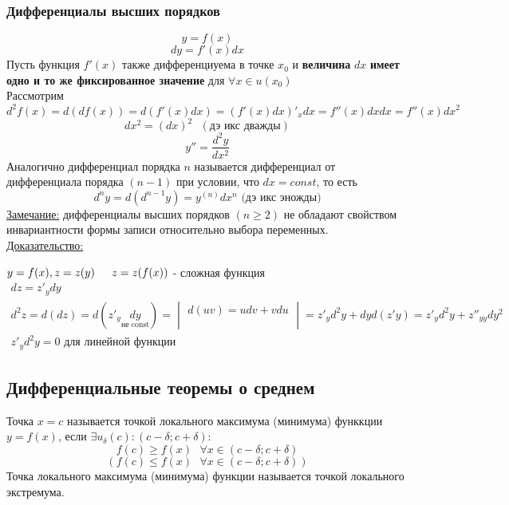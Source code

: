 \documentclass[12pt]{article}
\begin{document}
    \subsubsection*{Дифференциалы высших порядков}
    \[ y = f(x) \]
    \[ dy = f'(x)dx \]
    Пусть функция $f'(x)$ также дифференциуема в точке $x_0$ и \textbf{величина} $dx$ \textbf{имеет одно и то же фиксированное значение} для $\forall x \in u(x_0)$\\
    Рассмотрим \[ d^2f(x) = d(df(x)) = d(f'(x)dx) = (f'(x)dx)'_x dx = f''(x)dxdx = f''(x)dx^2 \] 
    \[ dx^2 = (dx)^2 \text{ } (\text{дэ икс дважды}) \]
    \[ y'' = \frac{d^2y}{dx^2} \]
    Аналогично дифференциал порядка $n$ называется дифференциал от дифференциала порядка $(n-1)$ при условии, что $dx = const$, то есть 
    \[ d^ny = d(d^{n-1}y) = y^{(n)}dx^n \text{ (дэ икс эножды)} \]
    \underline{Замечание:} дифференциалы высших порядков $(n \ge 2)$ не обладают свойством инвариантности формы записи относительно выбора переменных.\\
    \underline{Доказательство:}
    \begin{adjustwidth}{1.5em}{1.5em}
        $y = f(x), z = z(y) \indent z = z(f(x))$ - сложная функция\\
        \begin{gather*}
            dz = z'_ydy\\
            d^2z = d(dz) = d(z'_y\underset{\text{не const}}{dy}) = \begin{vmatrix}
                d(uv) = udv + vdu\\
                \\
            \end{vmatrix} = z'_yd^2y + dyd(z'y) = z'_yd^2y + z''_{yy}dy^2\\
            z'_yd^2y = 0 \text{ для линейной функции}
        \end{gather*}
    \end{adjustwidth}

    \subsection{Дифференциальные теоремы о среднем}
    Точка $x = c$ называется точкой локального максимума (минимума) функкции $y = f(x)$, если $\exists u_\delta(c) : (c - \delta; c + \delta) : $\\
    \[ f(c) \ge f(x) \text{ } \forall x \in (c - \delta; c + \delta) \]
    \[ \left( f(c) \le f(x) \text{ } \forall x \in (c - \delta; c + \delta) \right) \]
    Точка локального максимума (минимума) функции называется точкой локального экстремума.
\end{document}
